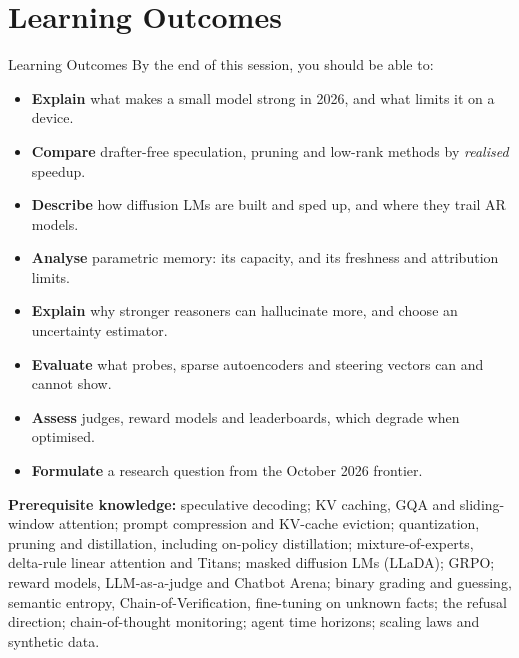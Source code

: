 \section{Learning Outcomes}

\begin{frame}{Learning Outcomes}
    By the end of this session, you should be able to:
    \begin{itemize}\small\itemsep0.05em
        \item \textbf{Explain} what makes a small model strong in 2026, and what limits it on a device.
        \item \textbf{Compare} drafter-free speculation, pruning and low-rank methods by \emph{realised} speedup.
        \item \textbf{Describe} how diffusion LMs are built and sped up, and where they trail AR models.
        \item \textbf{Analyse} parametric memory: its capacity, and its freshness and attribution limits.
        \item \textbf{Explain} why stronger reasoners can hallucinate more, and choose an uncertainty estimator.
        \item \textbf{Evaluate} what probes, sparse autoencoders and steering vectors can and cannot show.
        \item \textbf{Assess} judges, reward models and leaderboards, which degrade when optimised.
        \item \textbf{Formulate} a research question from the October 2026 frontier.
    \end{itemize}
    \vspace{0.2em}
    {\scriptsize \textbf{Prerequisite knowledge:} speculative decoding; KV caching, GQA and sliding-window attention; prompt compression and KV-cache eviction; quantization, pruning and distillation, including on-policy distillation; mixture-of-experts, delta-rule linear attention and Titans; masked diffusion LMs (LLaDA); GRPO; reward models, LLM-as-a-judge and Chatbot Arena; binary grading and guessing, semantic entropy, Chain-of-Verification, fine-tuning on unknown facts; the refusal direction; chain-of-thought monitoring; agent time horizons; scaling laws and synthetic data.\par}
\end{frame}
